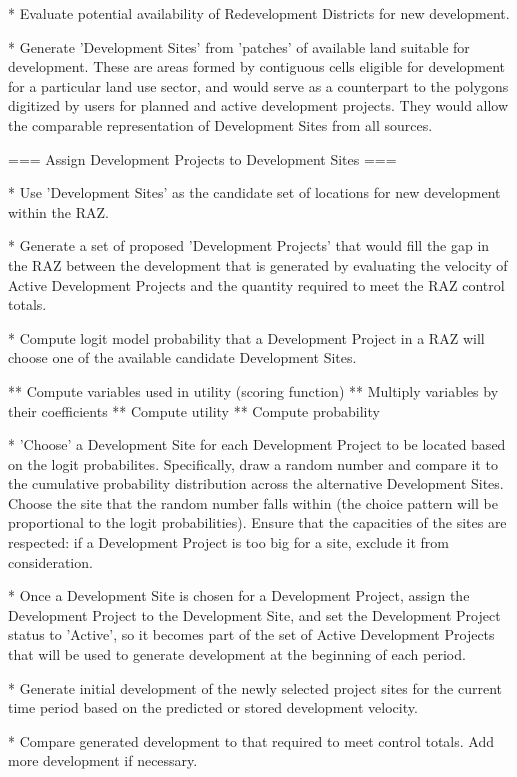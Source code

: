 * Evaluate potential availability of Redevelopment Districts for new development.

* Generate 'Development Sites' from 'patches' of available land suitable for development.  These are areas formed by contiguous cells eligible for development for a particular land use sector, and would serve as a counterpart to the polygons digitized by users for planned and active development projects.  They would allow the comparable representation of Development Sites from all sources.

=== Assign Development Projects to Development Sites ===

* Use 'Development Sites' as the candidate set of locations for new development within the RAZ.

* Generate a set of proposed 'Development Projects' that would fill the gap in the RAZ between the development that is generated by evaluating the velocity of Active Development Projects and the quantity required to meet the RAZ control totals.

* Compute logit model probability that a Development Project in a RAZ will choose one of the available candidate Development Sites.

** Compute variables used in utility (scoring function)
** Multiply variables by their coefficients
** Compute utility
** Compute probability

* 'Choose' a Development Site for each Development Project to be located based on the logit probabilites.  Specifically, draw a random number and compare it to the cumulative probability distribution across the alternative Development Sites.  Choose the site that the random number falls within (the choice pattern will be proportional to the logit probabilities).  Ensure that the capacities of the sites are respected: if a Development Project is too big for a site, exclude it from consideration.

* Once a Development Site is chosen for a Development Project, assign the Development Project to the Development Site, and set the Development Project status to 'Active', so it becomes part of the set of Active Development Projects that will be used to generate development at the beginning of each period.

* Generate initial development of the newly selected project sites for the current time period based on the predicted or stored development velocity.

* Compare generated development to that required to meet control totals.  Add more development if necessary.

